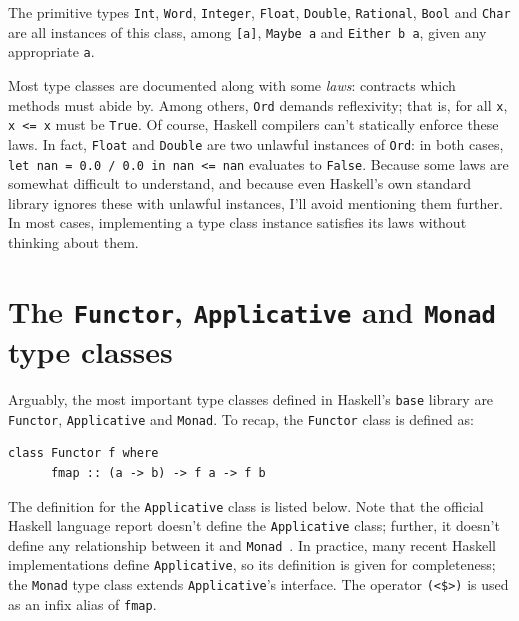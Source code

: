 \documentclass[UdineBachThesis,american,11pt]{PhdThesis}
\begin{document}
  The primitive types \mbox{\texttt{Int}}, \mbox{\texttt{Word}},
  \mbox{\texttt{Integer}}, \mbox{\texttt{Float}}, \mbox{\texttt{Double}},
  \mbox{\texttt{Rational}}, \mbox{\texttt{Bool}} and \mbox{\texttt{Char}} are
  all instances of this class, among \mbox{\texttt{[a]}}, \mbox{\texttt{Maybe
  a}} and \mbox{\texttt{Either b a}}, given any appropriate \texttt{a}.

  Most type classes are documented along with some \emph{laws}: contracts which
  methods must abide by. Among others, \mbox{\texttt{Ord}} demands reflexivity;
  that is, for all \texttt{x}, \mbox{\texttt{x <= x}} must be
  \mbox{\texttt{True}}. Of course, Haskell compilers can't statically enforce
  these laws. In fact, \mbox{\texttt{Float}} and \mbox{\texttt{Double}} are two
  unlawful instances of \mbox{\texttt{Ord}}: in both cases, \mbox{\texttt{let
  nan = 0.0 / 0.0 in nan <= nan}} evaluates to \mbox{\texttt{False}}. Because
  some laws are somewhat difficult to understand, and because even Haskell's own
  standard library ignores these with unlawful instances, I'll avoid mentioning
  them further. In most cases, implementing a type class instance satisfies its
  laws without thinking about them.

  \section{The \texttt{Functor}, \texttt{Applicative} and \texttt{Monad} type classes}

  Arguably, the most important type classes defined in Haskell's
  \mbox{\texttt{base}} library are \mbox{\texttt{Functor}},
  \mbox{\texttt{Applicative}} and \mbox{\texttt{Monad}}. To recap, the
  \mbox{\texttt{Functor}} class is defined as:

  \begin{Verbatim}[gobble=4,fontsize=\small]
    class Functor f where
      fmap :: (a -> b) -> f a -> f b
  \end{Verbatim}

  The definition for the \mbox{\texttt{Applicative}} class is listed below. Note
  that the official Haskell language report doesn't define the
  \mbox{\texttt{Applicative}} class; further, it doesn't define any relationship
  between it and \mbox{\texttt{Monad}}~\cite{haskell-functor-and-monad-classes}.
  In practice, many recent Haskell implementations define
  \mbox{\texttt{Applicative}}, so its definition is given for completeness; the
  \mbox{\texttt{Monad}} type class extends \mbox{\texttt{Applicative}}'s
  interface. The operator \mbox{\texttt{(<\$>)}} is used as an infix alias of
  \mbox{\texttt{fmap}}.
\end{document}
